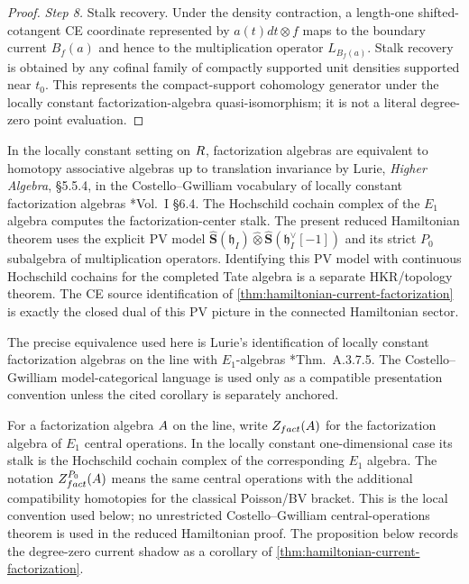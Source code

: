 \documentclass[11pt]{memoir}
\begin{document}
\begin{proof}
  \emph{Step 8.} Stalk recovery. Under the density contraction, a
  length-one shifted-cotangent CE coordinate represented by
  \(a(t)dt\otimes f\) maps to the boundary current \(B_f(a)\) and hence
  to the multiplication operator
  \(L_{B_f(a)}\). Stalk recovery is obtained by any cofinal family of
  compactly supported unit densities supported near \(t_0\). This
  represents the compact-support cohomology generator under the locally
  constant factorization-algebra quasi-isomorphism; it is not a literal
  degree-zero point evaluation.
\end{proof}

\begin{rmk}\label{rmk:E1-translation}
  In the locally constant setting on $R$, factorization algebras are
  equivalent to homotopy associative algebras up to translation
  invariance by Lurie, \emph{Higher Algebra}, \S 5.5.4, in the
	  Costello--Gwilliam vocabulary of locally constant factorization
	  algebras \cite{costello-gwilliam}*{Vol.~I \S 6.4}. The Hochschild
	  cochain complex of the $E_1$ algebra computes the
	  factorization-center stalk.  The present reduced Hamiltonian theorem
	  uses the explicit PV model
	  $\widehat{\mathbf S}(\mathfrak h_I)\widehat\otimes
	  \widehat{\mathbf S}(\mathfrak h_I^\vee[-1])$ and its strict $P_0$
	  subalgebra of multiplication operators.  Identifying this PV model
	  with continuous Hochschild cochains for the completed Tate algebra is
	  a separate HKR/topology theorem. The CE source
	  identification of
  \ref{thm:hamiltonian-current-factorization} is exactly the
  closed dual of this PV picture in the connected Hamiltonian sector.
\end{rmk}

\begin{rmk}\label{rmk:lurie-cg-quillen-equivalence}
  The precise equivalence used here is Lurie's identification of locally
  constant factorization algebras on the line with \(E_1\)-algebras
  \cite{lurie-ha}*{Thm.~A.3.7.5}.  The Costello--Gwilliam
  model-categorical language is used only as a compatible presentation
  convention unless the cited corollary is separately anchored.
\end{rmk}

For a factorization algebra $A$ on the line, write
$Z_{fact}(A)$ for the factorization algebra of $E_1$
central operations. In the locally constant one-dimensional case its stalk is
the Hochschild cochain complex of the corresponding $E_1$ algebra. The notation
$Z^{P_0}_{fact}(A)$ means the same central operations with
the additional compatibility homotopies for the classical Poisson/BV bracket.
This is the local convention used below; no unrestricted
Costello--Gwilliam central-operations theorem is used in the reduced
Hamiltonian proof.
The proposition below records the degree-zero current shadow as a
corollary of
\ref{thm:hamiltonian-current-factorization}.
\end{document}
